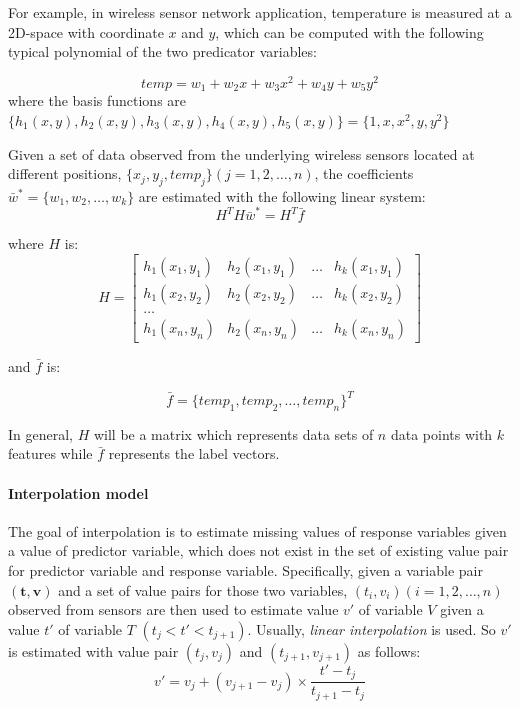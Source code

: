 For example, in wireless sensor network application, temperature is measured at a 2D-space with coordinate $x$ and $y$, which can be computed with the following typical polynomial of the two predicator variables:

\begin{equation}
temp=w_1 + w_2x+w_3x^2 + w_4y+w_5y^2
\end{equation}
where the basis functions are $\{h_1(x,y), h_2(x,y), h_3(x,y),h_4(x,y), h_5(x,y)\}=\{1, x, x^2, y, y^2\}$

Given a set of data observed from the underlying wireless sensors located at different positions, $\{x_j,y_j,temp_j\}(j=1,2,\dots,n)$, the coefficients $\bar{w}^* = \{w_1,w_2,\dots,w_k\}$ are estimated with the following linear system:
\begin{equation}\label{eq: regression_solve}
    H^TH\bar{w}^*=H^T\bar{f}
\end{equation}

where $H$ is:
\begin{equation}
    H=\begin{bmatrix}
h_1(x_1,y_1) & h_2(x_1,y_1) &\dots &h_k(x_1,y_1)\\
h_1(x_2,y_2) & h_2(x_2,y_2) &\dots &h_k(x_2,y_2)\\
\dots\\
h_1(x_n,y_n) & h_2(x_n,y_n) &\dots &h_k(x_n,y_n)
\end{bmatrix}
\end{equation}

and $\bar{f}$ is:

\begin{equation}
    \bar{f} = \{temp_1, temp_2,\dots, temp_n\}^T
\end{equation}

In general, $H$ will be a matrix which represents data sets of $n$ data points with $k$ features while $\bar{f}$ represents the label vectors.

\paragraph{Interpolation model} 

The goal of interpolation is to estimate missing values of response variables given a value of predictor variable, which does not exist in the set of existing value pair for predictor variable and response variable. Specifically, given a variable pair $(\textbf{t},\textbf{v})$ and a set of value pairs for those two variables, $(t_i, v_i)(i=1,2,\dots,n)$ observed from sensors are then used to estimate value $v'$ of variable $V$ given a value $t'$ of variable $T$ $(t_j< t' < t_{j+1})$. Usually, {\em linear interpolation} is used. So $v'$ is estimated with value pair $(t_j, v_j)$ and $(t_{j+1}, v_{j+1})$ as follows:
\begin{equation}\label{eq: interpolation}
    v'= v_j + (v_{j+1}-v_j)\times\frac{t'-t_j}{t_{j+1}-t_j}
\end{equation}




